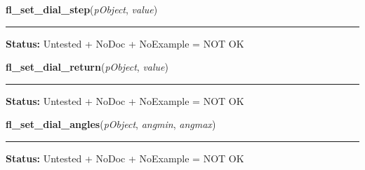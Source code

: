     \label{xformslib:library:fl_set_dial_step}

    \vspace{0.5ex}

\hspace{.8\funcindent}\begin{boxedminipage}{\funcwidth}

    \raggedright \textbf{fl\_set\_dial\_step}(\textit{pObject}, \textit{value})

    \vspace{-1.5ex}

    \rule{\textwidth}{0.5\fboxrule}
\setlength{\parskip}{2ex}
\setlength{\parskip}{1ex}
\textbf{Status:} Untested + NoDoc + NoExample = NOT OK



    \end{boxedminipage}

    \label{xformslib:library:fl_set_dial_return}

    \vspace{0.5ex}

\hspace{.8\funcindent}\begin{boxedminipage}{\funcwidth}

    \raggedright \textbf{fl\_set\_dial\_return}(\textit{pObject}, \textit{value})

    \vspace{-1.5ex}

    \rule{\textwidth}{0.5\fboxrule}
\setlength{\parskip}{2ex}
\setlength{\parskip}{1ex}
\textbf{Status:} Untested + NoDoc + NoExample = NOT OK



    \end{boxedminipage}

    \label{xformslib:library:fl_set_dial_angles}

    \vspace{0.5ex}

\hspace{.8\funcindent}\begin{boxedminipage}{\funcwidth}

    \raggedright \textbf{fl\_set\_dial\_angles}(\textit{pObject}, \textit{angmin}, \textit{angmax})

    \vspace{-1.5ex}

    \rule{\textwidth}{0.5\fboxrule}
\setlength{\parskip}{2ex}
\setlength{\parskip}{1ex}
\textbf{Status:} Untested + NoDoc + NoExample = NOT OK



    \end{boxedminipage}

